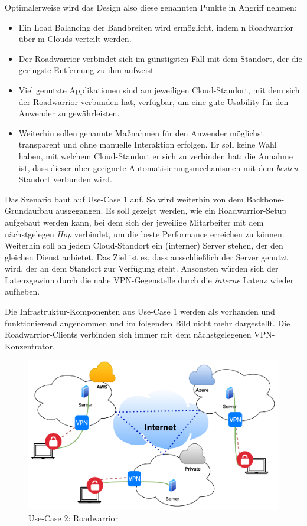 Optimalerweise wird das Design also diese genannten Punkte in Angriff nehmen:\\

\begin{itemize}
\item Ein Load Balancing der Bandbreiten wird ermöglicht, indem n Roadwarrior über m Clouds verteilt werden.
\item Der Roadwarrior verbindet sich im günstigsten Fall mit dem Standort, der die geringste Entfernung zu ihm aufweist.
\item Viel genutzte Applikationen sind am jeweiligen Cloud-Standort, mit dem sich der Roadwarrior verbunden hat, verfügbar, um eine gute Usability für den Anwender zu gewährleisten.
\item Weiterhin sollen genannte Maßnahmen für den Anwender möglichst transparent und ohne manuelle Interaktion erfolgen. Er soll keine Wahl haben, mit welchem Cloud-Standort er sich zu verbinden hat: die Annahme ist, dass dieser über geeignete Automatisierungsmechanismen mit dem \textit{besten} Standort verbunden wird.
\end{itemize}

Das Szenario baut auf Use-Case 1 auf. So wird weiterhin von dem Backbone-Grundaufbau ausgegangen. Es soll gezeigt werden, wie ein Roadwarrior-Setup aufgebaut werden kann, bei dem sich der jeweilige Mitarbeiter mit dem nächstgelegen \textit{Hop} verbindet, um die beste Performance erreichen zu können. Weiterhin soll an jedem Cloud-Standort ein (interner) Server stehen, der den gleichen Dienst anbietet. Das Ziel ist es, dass ausschließlich der Server genutzt wird, der an dem Standort zur Verfügung steht. Ansonsten würden sich der Latenzgewinn durch die nahe VPN-Gegenstelle durch die \textit{interne} Latenz wieder aufheben.

Die Infrastruktur-Komponenten aus Use-Case 1 werden als vorhanden und funktionierend angenommen und im folgenden Bild nicht mehr dargestellt. Die Roadwarrior-Clients verbinden sich immer mit dem nächstgelegenen VPN-Konzentrator.

\begin{figure}[h]
  \centering
  \includegraphics{Figures/Use-Case_2_Vereinfacht_1.pdf}
  \caption{Use-Case 2: Roadwarrior}
  \label{grafik:Use-Case-2_Vereinfacht}
\end{figure}

